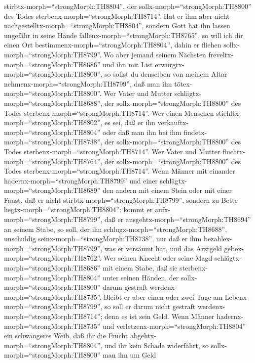 stirbtx-morph=``strongMorph:TH8804'', der
sollx-morph=``strongMorph:TH8800'' des Todes
sterbenx-morph=``strongMorph:TH8714''.  Hat er ihm aber
nicht nachgestelltx-morph=``strongMorph:TH8804'', sondern Gott hat ihn
lassen ungefähr in seine Hände fallenx-morph=``strongMorph:TH8765'', so
will ich dir einen Ort bestimmenx-morph=``strongMorph:TH8804'', dahin er
fliehen sollx-morph=``strongMorph:TH8799''.  Wo aber jemand
seinem Nächsten freveltx-morph=``strongMorph:TH8686'' und ihn mit List
erwürgtx-morph=``strongMorph:TH8800'', so sollst du denselben von meinem
Altar nehmenx-morph=``strongMorph:TH8799'', daß man ihn
tötex-morph=``strongMorph:TH8800''.  Wer Vater und Mutter
schlägtx-morph=``strongMorph:TH8688'', der
sollx-morph=``strongMorph:TH8800'' des Todes
sterbenx-morph=``strongMorph:TH8714''.  Wer einen Menschen
stiehltx-morph=``strongMorph:TH8802'', es sei, daß er ihn
verkauftx-morph=``strongMorph:TH8804'' oder daß man ihn bei ihm
findetx-morph=``strongMorph:TH8738'', der
sollx-morph=``strongMorph:TH8800'' des Todes
sterbenx-morph=``strongMorph:TH8714''.  Wer Vater und
Mutter fluchtx-morph=``strongMorph:TH8764'', der
sollx-morph=``strongMorph:TH8800'' des Todes
sterbenx-morph=``strongMorph:TH8714''.  Wenn Männer mit
einander hadernx-morph=``strongMorph:TH8799'' und einer
schlägtx-morph=``strongMorph:TH8689'' den andern mit einem Stein oder
mit einer Faust, daß er nicht stirbtx-morph=``strongMorph:TH8799'',
sondern zu Bette liegtx-morph=``strongMorph:TH8804'': 
kommt er aufx-morph=``strongMorph:TH8799'', daß er
ausgehtx-morph=``strongMorph:TH8694'' an seinem Stabe, so soll, der ihn
schlugx-morph=``strongMorph:TH8688'', unschuldig
seinx-morph=``strongMorph:TH8738'', nur daß er ihm
bezahlex-morph=``strongMorph:TH8799'', was er versäumt hat, und das
Arztgeld gebex-morph=``strongMorph:TH8762''.  Wer seinen
Knecht oder seine Magd schlägtx-morph=``strongMorph:TH8686'' mit einem
Stabe, daß sie sterbenx-morph=``strongMorph:TH8804'' unter seinen
Händen, der sollx-morph=``strongMorph:TH8800'' darum gestraft
werdenx-morph=``strongMorph:TH8735''.  Bleibt er aber einen
oder zwei Tage am Lebenx-morph=``strongMorph:TH8799'', so soll er darum
nicht gestraft werdenx-morph=``strongMorph:TH8714''; denn es ist sein
Geld.  Wenn Männer hadernx-morph=``strongMorph:TH8735'' und
verletzenx-morph=``strongMorph:TH8804'' ein schwangeres Weib, daß ihr
die Frucht abgehtx-morph=``strongMorph:TH8804'', und ihr kein Schade
widerfährt, so sollx-morph=``strongMorph:TH8800'' man ihn um Geld
